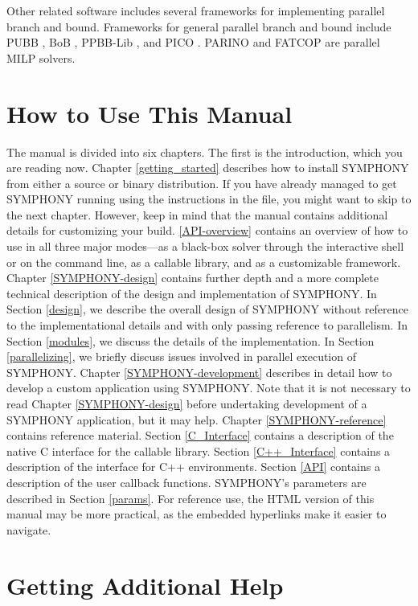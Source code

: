Other related software includes several frameworks for implementing parallel
branch and bound. Frameworks for general parallel branch and bound include
PUBB \cite{PUBB}, BoB \cite{BoB}, PPBB-Lib \cite{PPBB-Lib}, and PICO
\cite{PICO}. PARINO \cite{PARINO} and FATCOP \cite{chen:fatcop2} are parallel
MILP solvers.

\section{How to Use This Manual}

The manual is divided into six chapters. The first is the introduction, which
you are reading now. Chapter \ref{getting_started} describes how to install
SYMPHONY from either a source or binary distribution. If you have already
managed to get SYMPHONY running using the instructions in the 
file, you might want to skip to the next chapter. However, keep in mind that
the manual contains additional details for customizing your build.
\ref{API-overview} contains an overview of how to use in all three major
modes---as a black-box solver through the interactive shell or on the command
line, as a callable library, and as a customizable framework. Chapter
\ref{SYMPHONY-design} contains further depth and a more complete technical
description of the design and implementation of SYMPHONY. In Section
\ref{design}, we describe the overall design of SYMPHONY without reference to
the implementational details and with only passing reference to parallelism.
In Section \ref{modules}, we discuss the details of the implementation. In
Section \ref{parallelizing}, we briefly discuss issues involved in parallel
execution of SYMPHONY. Chapter \ref{SYMPHONY-development} describes in detail
how to develop a custom application using SYMPHONY. Note that it is not
necessary to read Chapter \ref{SYMPHONY-design} before undertaking development
of a SYMPHONY application, but it may help. Chapter \ref{SYMPHONY-reference}
contains reference material. Section \ref{C_Interface} contains a description
of the native C interface for the callable library. Section
\ref{C++_Interface} contains a description of the interface for C++
environments. Section \ref{API} contains a description of the user callback
functions. SYMPHONY's parameters are described in Section \ref{params}. For
reference use, the HTML version of this manual may be more practical, as the
embedded hyperlinks make it easier to navigate.

\section{Getting Additional Help}
\label{resources}

